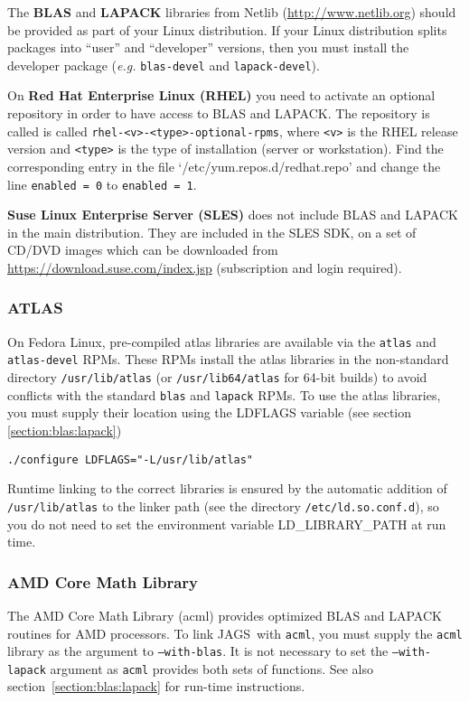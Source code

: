 \documentclass[11pt, a4paper, titlepage]{article}
\newcommand{\JAGS}{\textsf{JAGS}}
\newcommand{\code}[1]{{\bgroup{\normalfont\ttfamily #1}\egroup}}
\newcommand{\file}[1]{{`\normalfont\textsf{#1}'}}
\begin{document}
The {\bf BLAS} and {\bf LAPACK} libraries from Netlib
(\url{http://www.netlib.org}) should be provided as part of your Linux
distribution. If your Linux distribution splits packages into ``user''
and ``developer'' versions, then you must install the developer
package ({\em e.g.}  \texttt{blas-devel} and \texttt{lapack-devel}).

On {\bf Red Hat Enterprise Linux (RHEL)} you need to activate an
optional repository in order to have access to BLAS and LAPACK.  The
repository is called is called \texttt{rhel-<v>-<type>-optional-rpms},
where \texttt{<v>} is the RHEL release version and \texttt{<type>} is
the type of installation (server or workstation). Find the
corresponding entry in the file \file{/etc/yum.repos.d/redhat.repo}
and change the line \texttt{enabled = 0} to \texttt{enabled = 1}.

{\bf Suse Linux Enterprise Server (SLES)} does not include BLAS and
LAPACK in the main distribution. They are included in the SLES SDK, on
a set of CD/DVD images which can be downloaded from
\url{https://download.suse.com/index.jsp} (subscription and login
required).

\subsubsection{ATLAS}

On Fedora Linux, pre-compiled atlas libraries are available via the
\texttt{atlas} and \texttt{atlas-devel} RPMs.  These RPMs install the
atlas libraries in the non-standard directory \texttt{/usr/lib/atlas}
(or \texttt{/usr/lib64/atlas} for 64-bit builds) to avoid conflicts
with the standard \texttt{blas} and \texttt{lapack} RPMs. To use the
atlas libraries, you must supply their location using the
\code{LDFLAGS} variable (see section \ref{section:blas:lapack})
\begin{verbatim}
./configure LDFLAGS="-L/usr/lib/atlas"
\end{verbatim}
Runtime linking to the correct libraries is ensured by the automatic
addition of \texttt{/usr/lib/atlas} to the linker path (see the directory
\texttt{/etc/ld.so.conf.d}), so you do not need to set the
environment variable \code{LD\_LIBRARY\_PATH} at run time.

\subsubsection{AMD Core Math Library}
\label{section:acml:linux}

The AMD Core Math Library (acml) provides optimized BLAS and LAPACK
routines for AMD processors. To link \JAGS\ with \texttt{acml}, you must
supply the \texttt{acml} library as the argument to \texttt{--with-blas}.
It is not necessary to set the \texttt{--with-lapack} argument
as \texttt{acml} provides both sets of functions. See also
section~\ref{section:blas:lapack} for run-time instructions.
\end{document}
